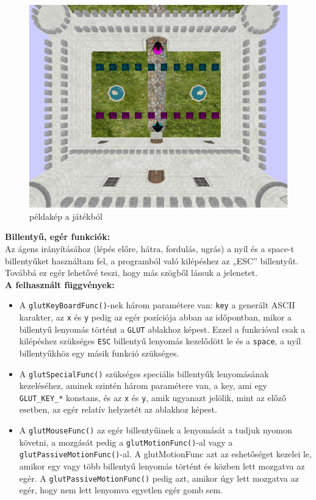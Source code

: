 \begin{figure}[htp]
    \centering
   	\includegraphics[width=6truecm, height=4truecm]{images/game.png}
	\caption{példakép a játékból}
\end{figure}


{\bf Billentyű, egér funkciók:}\\

Az ágens irányításához (lépés előre, hátra, fordulás, ugrás) a nyíl és a space-t billentyűket használtam fel, a  programból való kilépéshez az „ESC” billentyűt. Továbbá ez egér lehetővé teszi, hogy más szögből lássuk a jelenetet.\\ %

{ \bf A felhasznált függvények:}

\begin{itemize}
\item A \texttt{glutKeyBoardFunc()}-nek három paramétere van: \texttt{key} a generált ASCII karakter, az \texttt{x} és \texttt{y} pedig az egér pozíciója abban az időpontban, mikor a billentyű lenyomás történt a \texttt{GLUT} ablakhoz képest. Ezzel a funkcióval csak a kilépéshez szükséges \texttt{ESC} billentyű lenyomás kezelődött le és a \texttt{space}, a nyíl billentyűkhöz egy másik funkció szükséges.
\item A \texttt{glutSpecialFunc()} szükséges speciális billentyűk lenyomásának kezeléséhez,
aminek szintén három paramétere van, a key, ami egy \texttt{GLUT\_KEY\_*} konstans, és az \texttt{x} és \texttt{y}, amik ugyanazt jelölik, mint az előző esetben, az egér relatív helyzetét az ablakhoz képest.
\item A \texttt{glutMouseFunc()} az egér billentyűinek a lenyomását a  tudjuk nyomon követni, a mozgását pedig a \texttt{glutMotionFunc()}-al vagy a \texttt{glutPassiveMotionFunc()}-al. A glutMotionFunc azt az eshetőséget kezelei le, amikor egy vagy több billentyű lenyomás történt és közben lett mozgatva az egér. A \texttt{glutPassiveMotionFunc()} pedig azt, amikor úgy lett mozgatva az egér, hogy nem lett lenyomva egyetlen egér gomb sem.
\end{itemize}
